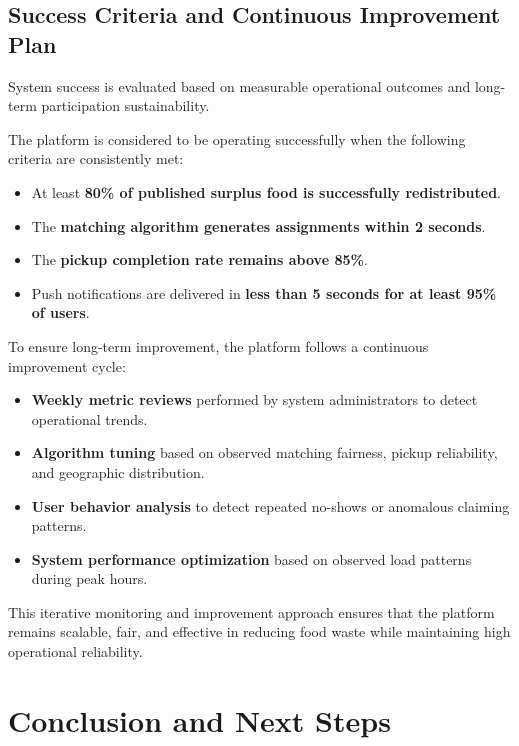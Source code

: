 \documentclass[conference]{IEEEtran}
\begin{document}
\subsection{Success Criteria and Continuous Improvement Plan}

System success is evaluated based on measurable operational outcomes and long-term participation sustainability.

The platform is considered to be operating successfully when the following criteria are consistently met:

\begin{itemize}
    \item At least \textbf{80\% of published surplus food is successfully redistributed}.
    \item The \textbf{matching algorithm generates assignments within 2 seconds}.
    \item The \textbf{pickup completion rate remains above 85\%}.
    \item Push notifications are delivered in \textbf{less than 5 seconds for at least 95\% of users}.
\end{itemize}

To ensure long-term improvement, the platform follows a continuous improvement cycle:

\begin{itemize}
    \item \textbf{Weekly metric reviews} performed by system administrators to detect operational trends.
    \item \textbf{Algorithm tuning} based on observed matching fairness, pickup reliability, and geographic distribution.
    \item \textbf{User behavior analysis} to detect repeated no-shows or anomalous claiming patterns.
    \item \textbf{System performance optimization} based on observed load patterns during peak hours.
\end{itemize}

This iterative monitoring and improvement approach ensures that the platform remains scalable, fair, and effective in reducing food waste while maintaining high operational reliability.

\section{Conclusion and Next Steps}
\end{document}
